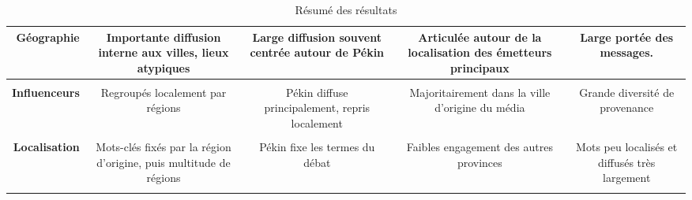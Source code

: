 \begin{table}[h!]
\begin{tabulary}{\linewidth}{ r | C C C C}
        \textbf{Géographie} &
        Importante diffusion interne aux villes, lieux atypiques  &
        Large diffusion souvent centrée autour de Pékin &
        Articulée autour de la localisation des émetteurs principaux &
        Large portée des messages. \\
        \hline \\[-1.2ex]

        \textbf{Influenceurs} &
        Regroupés localement par régions & 
        Pékin diffuse principalement, repris localement  &
        Majoritairement dans la ville d'origine du média &
        Grande diversité de provenance \\
        \hline \\[-1.2ex]

        \textbf{Localisation} &
        Mots-clés fixés par la région d'origine, puis multitude de régions &
        Pékin fixe les termes du débat &
        Faibles engagement des autres provinces &
        Mots peu localisés et diffusés très largement \\
        \hline \\[-1.2ex]

        
        


    \end{tabulary}
    \caption[Résumé des résultats]{Résumé des résultats}
    \label{fig:viz-results}
\end{table}
\newpage